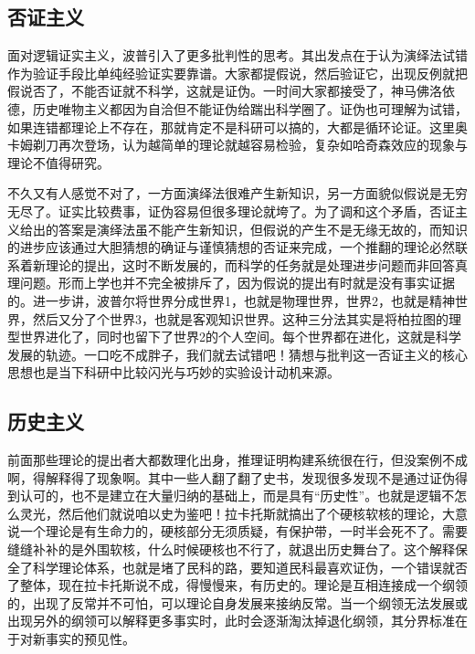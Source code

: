 \documentclass[]{tufte-book}
\begin{document}
\hypertarget{ux5426ux8bc1ux4e3bux4e49}{%
\subsection{否证主义}\label{ux5426ux8bc1ux4e3bux4e49}}

面对逻辑证实主义，波普引入了更多批判性的思考。其出发点在于认为演绎法试错作为验证手段比单纯经验证实要靠谱。大家都提假说，然后验证它，出现反例就把假说否了，不能否证就不科学，这就是证伪。一时间大家都接受了，神马佛洛依德，历史唯物主义都因为自洽但不能证伪给踹出科学圈了。证伪也可理解为试错，如果连错都理论上不存在，那就肯定不是科研可以搞的，大都是循环论证。这里奥卡姆剃刀再次登场，认为越简单的理论就越容易检验，复杂如哈奇森效应的现象与理论不值得研究。

不久又有人感觉不对了，一方面演绎法很难产生新知识，另一方面貌似假说是无穷无尽了。证实比较费事，证伪容易但很多理论就垮了。为了调和这个矛盾，否证主义给出的答案是演绎法虽不能产生新知识，但假说的产生不是无缘无故的，而知识的进步应该通过大胆猜想的确证与谨慎猜想的否证来完成，一个推翻的理论必然联系着新理论的提出，这时不断发展的，而科学的任务就是处理进步问题而非回答真理问题。形而上学也并不完全被排斥了，因为假说的提出有时就是没有事实证据的。进一步讲，波普尔将世界分成世界1，也就是物理世界，世界2，也就是精神世界，然后又分了个世界3，也就是客观知识世界。这种三分法其实是将柏拉图的理型世界进化了，同时也留下了世界2的个人空间。每个世界都在进化，这就是科学发展的轨迹。一口吃不成胖子，我们就去试错吧！猜想与批判这一否证主义的核心思想也是当下科研中比较闪光与巧妙的实验设计动机来源。

\hypertarget{ux5386ux53f2ux4e3bux4e49}{%
\subsection{历史主义}\label{ux5386ux53f2ux4e3bux4e49}}

前面那些理论的提出者大都数理化出身，推理证明构建系统很在行，但没案例不成啊，得解释得了现象啊。其中一些人翻了翻了史书，发现很多发现不是通过证伪得到认可的，也不是建立在大量归纳的基础上，而是具有``历史性''。也就是逻辑不怎么灵光，然后他们就说咱以史为鉴吧！拉卡托斯就搞出了个硬核软核的理论，大意说一个理论是有生命力的，硬核部分无须质疑，有保护带，一时半会死不了。需要缝缝补补的是外围软核，什么时候硬核也不行了，就退出历史舞台了。这个解释保全了科学理论体系，也就是堵了民科的路，要知道民科最喜欢证伪，一个错误就否了整体，现在拉卡托斯说不成，得慢慢来，有历史的。理论是互相连接成一个纲领的，出现了反常并不可怕，可以理论自身发展来接纳反常。当一个纲领无法发展或出现另外的纲领可以解释更多事实时，此时会逐渐淘汰掉退化纲领，其分界标准在于对新事实的预见性。
\end{document}
